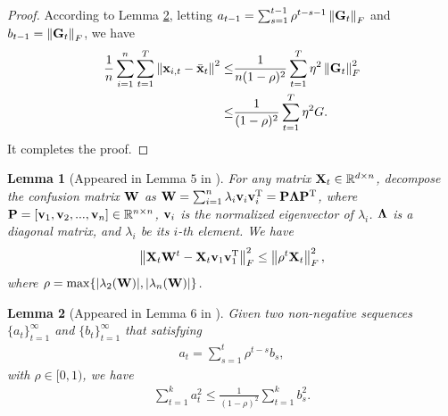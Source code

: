 \documentclass{article}
\newtheorem{Lemma}{\bf{Lemma}}
\begin{document}
\begin{proof}
According to Lemma \ref{lemma_hanlin_2}, letting $a_{t-1} = \sum_{s=1}^{t-1} \rho^{t-s-1} \left\lVert{\bf G}_t\right\rVert_F$ and $b_{t-1} = \left\lVert{\bf G}_t\right\rVert_F$, we have
\begin{align}
\nonumber
\frac{1}{n}\sum_{i=1}^n \sum_{t=1}^T \left\lVert{\bf x}_{i,t} - \bar{{\bf x}}_t\right\rVert^2 \le & \frac{1}{n(1-\rho)^2} \sum_{t=1}^T \eta^2 \left\lVert{\bf G}_t\right\rVert_F^2 \\ \nonumber
\le & \frac{1}{(1-\rho)^2} \sum_{t=1}^T \eta^2 G.
\end{align}
It completes the proof.


\end{proof}








\begin{Lemma}[Appeared in Lemma $5$ in \citep{Tang:2018un}]
\label{lemma_hanlin_1}
For any matrix ${\bf X}_t\in\mathbb{R}^{d\times n}$, decompose the confusion matrix ${\bf W}$ as ${\bf W} = \sum_{i=1}^n \lambda_i {\bf v}_i {\bf v}_i^{\rm T} = {\bf P} \mathbf{\Lambda} {\bf P}^{\rm T}$, where ${\bf P} = [{\bf v}_1, {\bf v}_2, ..., {\bf v}_n]\in\mathbb{R}^{n\times n}$, ${\bf v}_i$ is the normalized eigenvector of $\lambda_i$. $\mathbf{\Lambda}$ is a diagonal matrix, and $\lambda_i$ be its $i$-th element. We have
\begin{align}
\nonumber
\left\lVert{\bf X}_t {\bf W}^t - {\bf X}_t {\bf v}_1 {\bf v}_1^{\rm T} \right\rVert_F^2 \le \left\lVert\rho^t {\bf X}_t\right\rVert_F^2, 
\end{align} where  $\rho = \max \{| \lambda_2({\bf W}) |, | \lambda_n({\bf W}) |\}$. 

\end{Lemma}


\begin{Lemma}[Appeared in Lemma $6$ in \citep{Tang:2018un}]
\label{lemma_hanlin_2}
Given two non-negative sequences $\{a_t\}_{t=1}^{\infty}$ and $\{b_t\}_{t=1}^{\infty}$ that satisfying
\begin{align}
\nonumber
a_t = \sum_{s=1}^t \rho^{t-s} b_s,
\end{align} with $\rho \in [0,1)$, we have
\begin{align}
\nonumber
\sum_{t=1}^k a_t^2 \le \frac{1}{(1-\rho)^2}\sum_{t=1}^k b_s^2.
\end{align}
\end{Lemma}


















\end{document}
